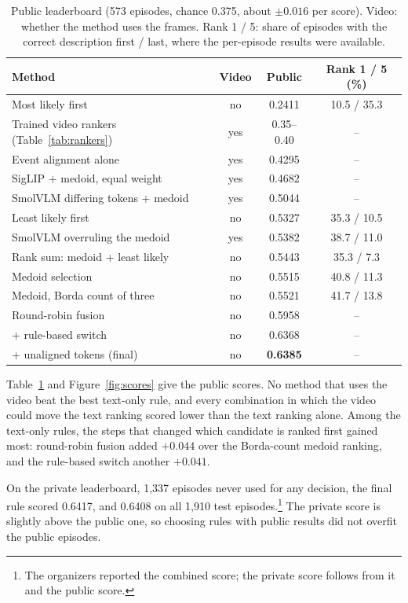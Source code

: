 \documentclass[10pt,twocolumn]{article}
\begin{document}
\begin{table}[t]
\caption{Public leaderboard (573 episodes, chance 0.375, about $\pm0.016$ per score). Video: whether the method
uses the frames. Rank 1 / 5: share of episodes with the correct description first / last, where the per-episode
results were available.}
\label{tab:public}
\footnotesize
\setlength{\tabcolsep}{2.5pt}
\begin{tabularx}{\columnwidth}{>{\raggedright\arraybackslash}Xccc}
\toprule
Method & Video & Public & Rank 1 / 5 (\%) \\
\midrule
Most likely first & no & 0.2411 & 10.5 / 35.3 \\
Trained video rankers (Table~\ref{tab:rankers}) & yes & 0.35--0.40 & -- \\
Event alignment alone & yes & 0.4295 & -- \\
SigLIP + medoid, equal weight & yes & 0.4682 & -- \\
SmolVLM differing tokens + medoid & yes & 0.5044 & -- \\
Least likely first & no & 0.5327 & 35.3 / 10.5 \\
SmolVLM overruling the medoid & yes & 0.5382 & 38.7 / 11.0 \\
Rank sum: medoid + least likely & no & 0.5443 & 35.3 / 7.3 \\
Medoid selection & no & 0.5515 & 40.8 / 11.3 \\
Medoid, Borda count of three & no & 0.5521 & 41.7 / 13.8 \\
Round-robin fusion & no & 0.5958 & -- \\
+ rule-based switch & no & 0.6368 & -- \\
+ unaligned tokens (final) & no & \textbf{0.6385} & -- \\
\bottomrule
\end{tabularx}
\end{table}

Table~\ref{tab:public} and Figure~\ref{fig:scores} give the public scores. No method that uses the video beat the
best text-only rule, and every combination in which the video could move the text ranking scored lower than the
text ranking alone. Among the text-only rules, the steps that changed which candidate is ranked first gained most:
round-robin fusion added $+0.044$ over the Borda-count medoid ranking, and the rule-based switch another $+0.041$.

On the private leaderboard, 1,337 episodes never used for any decision, the final rule scored 0.6417, and 0.6408
on all 1,910 test episodes.\footnote{The organizers reported the combined score; the private score follows from it
and the public score.} The private score is slightly above the public one, so choosing rules with public results
did not overfit the public episodes.
\end{document}
